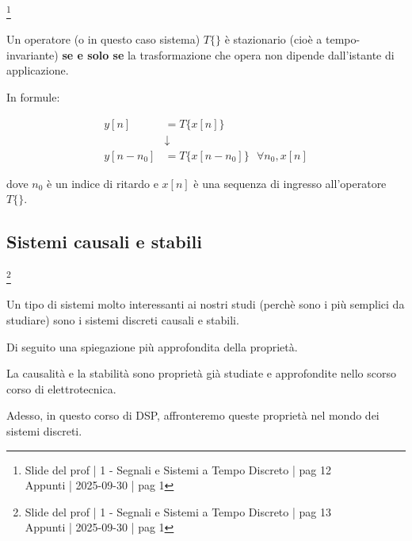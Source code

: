 \footnote{ 
    Slide del prof | 1 - Segnali e Sistemi a Tempo Discreto | pag 12\\
    Appunti | 2025-09-30 | pag 1
}

Un operatore (o in questo caso sistema) $T \{ \}$ è stazionario (cioè a tempo-invariante) \textbf{se e solo se} 
la trasformazione che opera non dipende dall'istante di applicazione. \newline 

In formule: 

{
    \Large 
    \begin{equation}
        \begin{split}
        y \left[ n\right]
        &= 
        T \{ x \left[ n \right]\}
        \\
        &\downarrow
        \\
        y \left[ n - n_0\right]
        &= 
        T \{ x \left[ n - n_0\right]\}
        \text{ }
        \forall n_0, x \left[ n\right]
        \end{split}
    \end{equation}
}

dove $n_0$ è un indice di ritardo e $x \left[ n\right]$ è una sequenza di ingresso all'operatore $T \{ \}$. \newline 

\newpage 

\subsection{Sistemi causali e stabili}

\footnote{ 
    Slide del prof | 1 - Segnali e Sistemi a Tempo Discreto | pag 13\\
    Appunti | 2025-09-30 | pag 1
}

Un tipo di sistemi molto interessanti ai nostri studi (perchè sono i più semplici da studiare) 
sono i sistemi discreti causali e stabili. \newline 

Di seguito una spiegazione più approfondita della proprietà. \newline 

\begin{tcolorbox}
La causalità e la stabilità sono proprietà già studiate e approfondite nello scorso corso di elettrotecnica. \newline 

Adesso, in questo corso di DSP, affronteremo queste proprietà nel mondo dei sistemi discreti. 
\end{tcolorbox}

